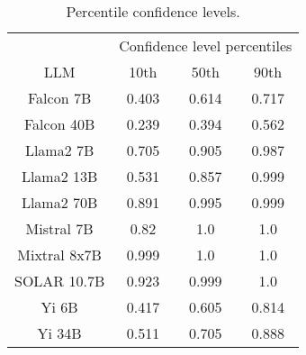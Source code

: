 \begin{table*}
\centering
\begin{tabular}{c|c|c|c}
& \multicolumn{3}{c}{Confidence level percentiles} \\ 
LLM & 10th & 50th & 90th\\ \hline
Falcon 7B & 0.403 & 0.614 & 0.717\\
Falcon 40B & 0.239 & 0.394 & 0.562\\
Llama2 7B & 0.705 & 0.905 & 0.987\\
Llama2 13B & 0.531 & 0.857 & 0.999\\
Llama2 70B & 0.891 & 0.995 & 0.999\\
Mistral 7B & 0.82 & 1.0 & 1.0\\
Mixtral 8x7B & 0.999 & 1.0 & 1.0\\
SOLAR 10.7B & 0.923 & 0.999 & 1.0\\
Yi 6B & 0.417 & 0.605 & 0.814\\
Yi 34B & 0.511 & 0.705 & 0.888\\
\hline
\end{tabular}
\caption{Percentile confidence levels.}
\label{tab:percentile_conf}
\end{table*}
